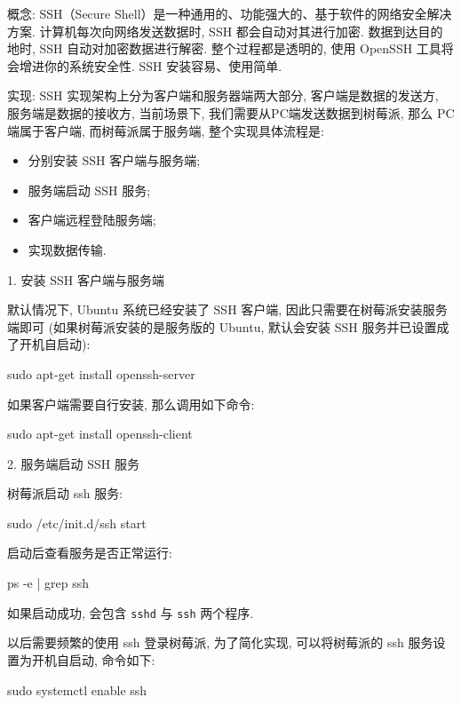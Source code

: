 \documentclass[openany, fontset=windowsold]{ctexbook}
\theoremstyle{kaiti}
\theoremstyle{normal}
\begin{document}
概念: SSH（Secure Shell）是一种通用的、功能强大的、基于软件的网络安全解决方案. 计算机每次向网络发送数据时, SSH 都会自动对其进行加密. 数据到达目的地时, SSH 自动对加密数据进行解密. 整个过程都是透明的, 使用 OpenSSH 工具将会增进你的系统安全性. SSH 安装容易、使用简单.

实现: SSH 实现架构上分为客户端和服务器端两大部分, 客户端是数据的发送方, 服务端是数据的接收方, 当前场景下, 我们需要从PC端发送数据到树莓派, 那么 PC 端属于客户端, 而树莓派属于服务端, 整个实现具体流程是:

\begin{itemize}
  \item 分别安装 SSH 客户端与服务端;
  \item 服务端启动 SSH 服务;
  \item 客户端远程登陆服务端;
  \item 实现数据传输.
\end{itemize}

1. 安装 SSH 客户端与服务端

默认情况下, Ubuntu 系统已经安装了 SSH 客户端, 因此只需要在树莓派安装服务端即可 (如果树莓派安装的是服务版的 Ubuntu, 默认会安装 SSH 服务并已设置成了开机自启动):

\begin{bash}
  sudo apt-get install openssh-server
\end{bash}

如果客户端需要自行安装, 那么调用如下命令:

\begin{bash}
  sudo apt-get install openssh-client
\end{bash}

2. 服务端启动 SSH 服务

树莓派启动 ssh 服务:

\begin{bash}
  sudo /etc/init.d/ssh start
\end{bash}

启动后查看服务是否正常运行:

\begin{bash}
  ps -e | grep ssh
\end{bash}

如果启动成功, 会包含 \verb|sshd| 与 \verb|ssh| 两个程序.

以后需要频繁的使用 ssh 登录树莓派, 为了简化实现, 可以将树莓派的 ssh 服务设置为开机自启动, 命令如下:

\begin{bash}
  sudo systemctl enable ssh
\end{bash}
\end{document}
